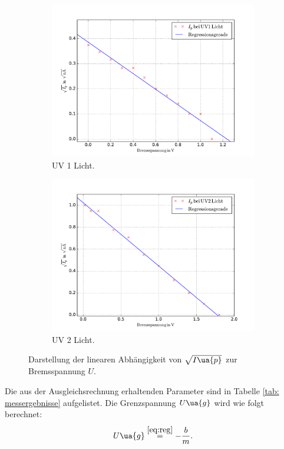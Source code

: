 \begin{figure}
  \centering
  \begin{subfigure}{0.48\textwidth}
    \centering
    \includegraphics[width=1 \textwidth]{../Messdaten/uv_eins.pdf}
    \caption{UV 1 Licht.}
    \label{fig: uv_eins}
  \end{subfigure}
  \begin{subfigure}{0.48\textwidth}
    \centering
    \includegraphics[width=1 \textwidth]{../Messdaten/uv_zwei.pdf}
    \caption{UV 2 Licht.}
    \label{fig: uv_zwei}
  \end{subfigure}
  \caption{Darstellung der linearen Abhängigkeit von $\sqrt{I\ua{p}}$ zur Bremsspannung $U$.}
  \label{fig: darstellung_3}
\end{figure}
Die aus der Ausgleichsrechnung erhaltenden Parameter sind in Tabelle %
\ref{tab: messergebnisse} aufgelistet. Die Grenzspannung $U\ua{g}$ wird
wie folgt berechnet:
\begin{equation}
  \label{eq:ug}
  U\ua{g}\overset{\ref{eq:reg}}{=}-\frac{b}{m}.
\end{equation}


